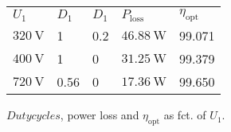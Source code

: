 
\begin{solutiontable}[ht]
    \centering  %
    \begin{tabular}{lllll}
        \toprule
        
        $U_\mathrm{1}$ & $D_1$   & $D_1$ & $P_\mathrm{loss}$      & $\eta_\mathrm{opt}$ \\ 
        $\SI{320}{\volt}$ & 1    & 0.2   & $\SI{46.88}{\watt}$ & 99.071 \\ 
        $\SI{400}{\volt}$ & 1    & 0     & $\SI{31.25}{\watt}$ & 99.379 \\ 
        $\SI{720}{\volt}$ & 0.56 & 0     & $\SI{17.36}{\watt}$ & 99.650 \\ 
        \bottomrule
    \end{tabular}
    \caption{$Dutycycles$, power loss and $\eta_\mathrm{opt}$ as fct. of $U_\mathrm{1}$.}     
\end{solutiontable}
